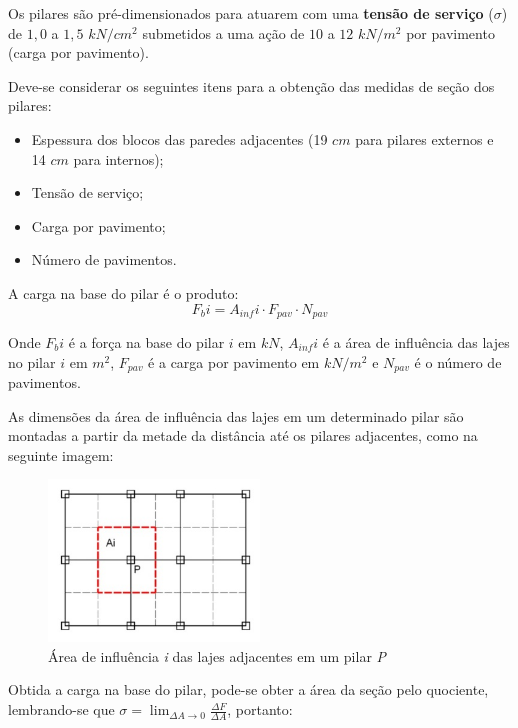 Os pilares são pré-dimensionados para atuarem com uma \textbf{tensão de serviço} ($\sigma$) de $1,0$ a $1,5$ $kN/cm^2$ submetidos a uma ação de $10$ a $12$ $kN/m^2$ por pavimento (carga por pavimento).

Deve-se considerar os seguintes itens para a obtenção das medidas de seção dos pilares:

\begin{itemize}
	\item Espessura dos blocos das paredes adjacentes (19 $cm$ para pilares externos e 14 $cm$ para internos);
	\item Tensão de serviço;
	\item Carga por pavimento;
	\item Número de pavimentos.
\end{itemize}

A carga na base do pilar é o produto: $$F_bi=A_{inf}i \cdot F_{pav} \cdot N_{pav}$$

Onde $F_bi$ é a força na base do pilar $i$ em $kN$, $A_{inf}i$ é a área de influência das lajes no pilar $i$ em $m^2$, $F_{pav}$ é a carga por pavimento em $kN/m^2$ e $N_{pav}$ é o número de pavimentos.

As dimensões da área de influência das lajes em um determinado pilar são montadas a partir da metade da distância até os pilares adjacentes, como na seguinte imagem:

\begin{figure}[h]
	\begin{center}
    	\includegraphics[width=0.5\textwidth]{Pre-dimensionamento-pilares-macicos/Imagens/Area-de-influencia-das-lajes-nos-pilares.jpg}
    	\caption{Área de influência \textit{i} das lajes adjacentes em um pilar \textit{P}}
	\end{center}
\end{figure}

Obtida a carga na base do pilar, pode-se obter a área da seção pelo quociente, lembrando-se que $\sigma = \lim_{\Delta A \rightarrow 0} \frac{\Delta F}{\Delta A}$, portanto:


